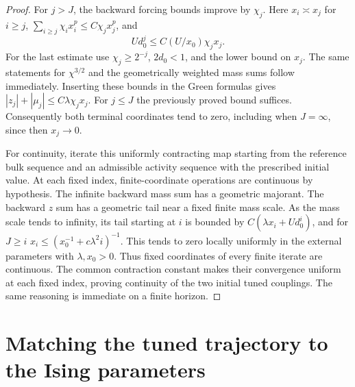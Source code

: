 \documentclass[11pt]{article}
\begin{document}
\begin{proof}
For \(j>J\), the backward forcing bounds improve by \(\chi_j\).
Here \(x_i\asymp x_j\) for \(i\ge j\),
\(\sum_{i\ge j}\chi_i x_i^p\le C\chi_j x_j^p\), and
\[
 Ud_0^j\le C(U/x_0)\chi_j x_j.
\]
For the last estimate use \(\chi_j\ge2^{-j}\),
\(2d_0<1\), and the lower bound on \(x_j\).
The same statements for \(\chi^{3/2}\) and the geometrically
weighted mass sums follow immediately.  Inserting these bounds in
the Green formulas gives
\( |z_j|+|\mu_j|\le C\lambda\chi_j x_j\).
For \(j\le J\) the previously proved bound suffices.
Consequently both terminal coordinates tend to zero, including
when \(J=\infty\), since then \(x_j\to0\).

For continuity, iterate this uniformly contracting map starting
from the reference bulk sequence and an admissible activity
sequence with the prescribed initial value.  At each fixed index,
finite-coordinate operations are continuous by hypothesis.
The infinite backward mass sum has a geometric majorant.
The backward \(z\) sum has a geometric tail near a fixed finite
mass scale.  As the mass scale tends to infinity, its tail starting
at \(i\) is bounded by
\(C(\lambda x_i+Ud_0^i)\), and for \(J\ge i\)
\(x_i\le(x_0^{-1}+c\lambda^2i)^{-1}\).  This tends to zero
locally uniformly in the external parameters with \(\lambda,x_0>0\).
Thus fixed coordinates of every finite iterate are continuous.
The common contraction constant makes their convergence uniform
at each fixed index, proving continuity of the two initial tuned
couplings.  The same reasoning is immediate on a finite horizon.
\end{proof}


\section{Matching the tuned trajectory to the Ising parameters}
\label{sec:matching-physical}
\end{document}
